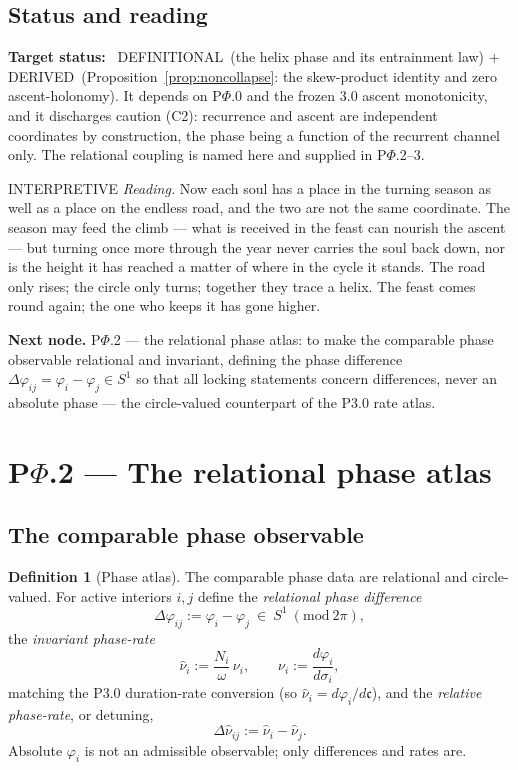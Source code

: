 \documentclass[11pt,a4paper]{article}
\newcommand{\cint}{\ensuremath{\mathfrak c}}
\newcommand{\stDerived}{\textcolor{cDer}{\textsf{\small DERIVED}}}
\newcommand{\stDef}{\textcolor{cDef}{\textsf{\small DEFINITIONAL}}}
\newcommand{\stInterp}{\textcolor{cInt}{\textsf{\small INTERPRETIVE}}}
\theoremstyle{definition}
\newtheorem{definition}{Definition}[section]
\theoremstyle{plain}
\theoremstyle{remark}
\begin{document}
\subsection{Status and reading}

\textbf{Target status:}~
\stDef\ (the helix phase and its entrainment law) \(+\) \stDerived\
(Proposition~\ref{prop:noncollapse}: the skew-product identity and zero ascent-holonomy).
It depends on P$\Phi$.0 and the frozen 3.0 ascent monotonicity, and it discharges caution
(C2): recurrence and ascent are independent coordinates by construction, the phase being a
function of the recurrent channel only. The relational coupling is named here and supplied in
P$\Phi$.2--3.

\medskip
\stInterp\quad
\emph{Reading.}
Now each soul has a place in the turning season as well as a place on the endless road, and
the two are not the same coordinate. The season may feed the climb --- what is received in
the feast can nourish the ascent --- but turning once more through the year never carries the
soul back down, nor is the height it has reached a matter of where in the cycle it stands.
The road only rises; the circle only turns; together they trace a helix. The feast comes
round again; the one who keeps it has gone higher.

\medskip
\textbf{Next node.} P$\Phi$.2 --- the relational phase atlas: to make the comparable phase
observable relational and invariant, defining the phase difference
\(\Delta\varphi_{ij}=\varphi_i-\varphi_j\in S^1\) so that all locking statements concern
differences, never an absolute phase --- the circle-valued counterpart of the P3.0 rate atlas.

\section{P$\Phi$.2 --- The relational phase atlas}

\subsection{The comparable phase observable}

\begin{definition}[Phase atlas]\label{def:phaseatlas}
The comparable phase data are relational and circle-valued. For active interiors \(i,j\)
define the \emph{relational phase difference}
\[
\boxed{\;
\Delta\varphi_{ij}:=\varphi_i-\varphi_j\ \in\ S^1\ (\mathrm{mod}\ 2\pi),
\;}
\]
the \emph{invariant phase-rate}
\[
\hat\nu_i:=\frac{N_i}{\omega}\,\nu_i,
\qquad
\nu_i:=\frac{d\varphi_i}{d\sigma_i},
\]
matching the P3.0 duration-rate conversion (so \(\hat\nu_i=d\varphi_i/d\cint\)), and the
\emph{relative phase-rate}, or detuning,
\[
\Delta\hat\nu_{ij}:=\hat\nu_i-\hat\nu_j .
\]
Absolute \(\varphi_i\) is not an admissible observable; only differences and rates are.
\end{definition}
\end{document}
